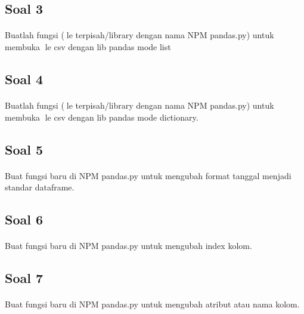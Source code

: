 \documentclass[a4paper,12pt]{report}
\begin{document}
\subsection*{Soal 3}
\paragraph{}Buatlah fungsi (le terpisah/library dengan nama NPM pandas.py) untuk membuka le csv dengan lib pandas mode list


\subsection*{Soal 4}
\paragraph{}Buatlah fungsi (le terpisah/library dengan nama NPM pandas.py) untuk membuka le csv dengan lib pandas mode dictionary.


\subsection*{Soal 5}
\paragraph{}Buat fungsi baru di NPM pandas.py untuk mengubah format tanggal menjadi standar dataframe.


\subsection*{Soal 6}
\paragraph{}Buat fungsi baru di NPM pandas.py untuk mengubah index kolom.
 

\subsection*{Soal 7}
\paragraph{}Buat fungsi baru di NPM pandas.py untuk mengubah atribut atau nama kolom.
   
\end{document}
